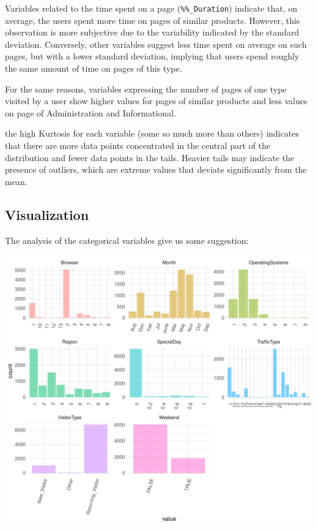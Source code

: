 \documentclass[
]{article}
\begin{document}
Variables related to the time spent on a page (\texttt{\%\%\_Duration})
indicate that, on average, the users spent more time on pages of similar
products. However, this observation is more subjective due to the
variability indicated by the standard deviation. Conversely, other
variables suggest less time spent on average on such pages, but with a
lower standard deviation, implying that users spend roughly the same
amount of time on pages of this type.

For the same reasons, variables expressing the number of pages of one
type visited by a user show higher values for pages of similar products
and less values on page of Administration and Informational.

the high Kurtosis for each variable (some so much more than others)
indicates that there are more data points concentrated in the central
part of the distribution and fewer data points in the tails. Heavier
tails may indicate the presence of outliers, which are extreme values
that deviate significantly from the mean.

\newpage

\subsection{Visualization}\label{visualization}

The analysis of the categorical variables give us some suggestion:

\includegraphics{report_official_files/figure-latex/unnamed-chunk-5-1.pdf}
\end{document}
